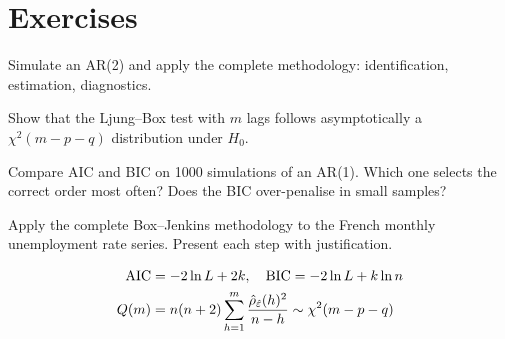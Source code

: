 \section{Exercises}

\begin{exercise}[$\star$]
Simulate an AR(2) and apply the complete methodology: identification, estimation, diagnostics.
\end{exercise}

\begin{exercise}[$\star\star$]
Show that the Ljung--Box test with $m$ lags follows asymptotically a $\chi^2(m-p-q)$ distribution under $H_0$.
\end{exercise}

\begin{exercise}[$\star\star$]
Compare AIC and BIC on 1000 simulations of an AR(1). Which one selects the correct order most often? Does the BIC over-penalise in small samples?
\end{exercise}

\begin{exercise}
Apply the complete Box--Jenkins methodology to the French monthly unemployment rate series. Present each step with justification.
\end{exercise}

\begin{keyformulas}
\begin{align*}
\operatorname{AIC} &= -2\ln L + 2k, \quad \operatorname{BIC} = -2\ln L + k\ln n \\
Q(m) &= n(n+2)\sum_{h=1}^m\frac{\hat\rho_{\hat{\varepsilon}}(h)^2}{n-h}\sim\chi^2(m-p-q)
\end{align*}
\end{keyformulas}
